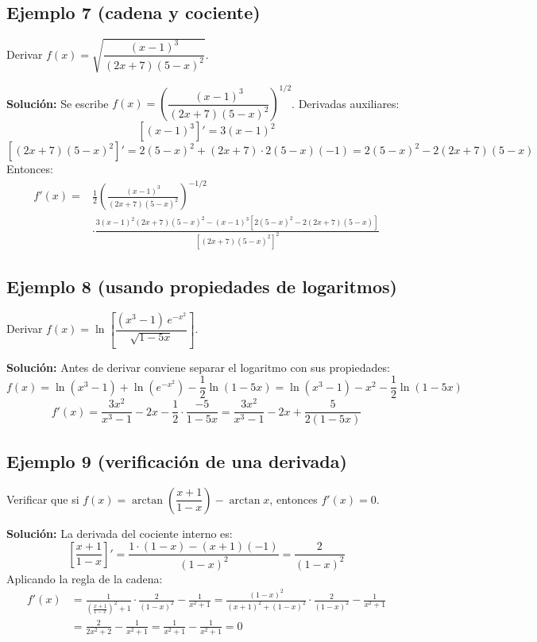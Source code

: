 \documentclass[12pt]{article}
\begin{document}
\subsection{Ejemplo 7 (cadena y cociente)}
Derivar $f(x) = \sqrt{\dfrac{(x - 1)^3}{(2x + 7)(5 - x)^2}}$.

\textbf{Solución:} Se escribe $f(x) = \left(\dfrac{(x - 1)^3}{(2x + 7)(5 - x)^2}\right)^{1/2}$. Derivadas auxiliares:
\[
\left[(x - 1)^3\right]' = 3(x - 1)^2
\]
\[
\left[(2x + 7)(5 - x)^2\right]' = 2(5 - x)^2 + (2x + 7) \cdot 2(5 - x)(-1) = 2(5 - x)^2 - 2(2x + 7)(5 - x)
\]
Entonces:
\begin{align*}
f'(x) = {} & \frac{1}{2}\left(\frac{(x - 1)^3}{(2x + 7)(5 - x)^2}\right)^{-1/2} \\
& \cdot \frac{3(x - 1)^2 (2x + 7)(5 - x)^2 - (x - 1)^3\left[2(5 - x)^2 - 2(2x + 7)(5 - x)\right]}{\left[(2x + 7)(5 - x)^2\right]^2}
\end{align*}

\subsection{Ejemplo 8 (usando propiedades de logaritmos)}
Derivar $f(x) = \ln\left[\dfrac{(x^3 - 1)\,e^{-x^2}}{\sqrt{1 - 5x}}\right]$.

\textbf{Solución:} Antes de derivar conviene separar el logaritmo con sus propiedades:
\[
f(x) = \ln(x^3 - 1) + \ln\left(e^{-x^2}\right) - \frac{1}{2}\ln(1 - 5x) = \ln(x^3 - 1) - x^2 - \frac{1}{2}\ln(1 - 5x)
\]
\[
f'(x) = \frac{3x^2}{x^3 - 1} - 2x - \frac{1}{2} \cdot \frac{-5}{1 - 5x} = \frac{3x^2}{x^3 - 1} - 2x + \frac{5}{2(1 - 5x)}
\]

\subsection{Ejemplo 9 (verificación de una derivada)}
Verificar que si $f(x) = \arctan\left(\dfrac{x + 1}{1 - x}\right) - \arctan x$, entonces $f'(x) = 0$.

\textbf{Solución:} La derivada del cociente interno es:
\[
\left[\frac{x + 1}{1 - x}\right]' = \frac{1 \cdot (1 - x) - (x + 1)(-1)}{(1 - x)^2} = \frac{2}{(1 - x)^2}
\]
Aplicando la regla de la cadena:
\begin{align*}
f'(x) &= \frac{1}{\left(\frac{x + 1}{1 - x}\right)^2 + 1} \cdot \frac{2}{(1 - x)^2} - \frac{1}{x^2 + 1}
= \frac{(1 - x)^2}{(x + 1)^2 + (1 - x)^2} \cdot \frac{2}{(1 - x)^2} - \frac{1}{x^2 + 1} \\
&= \frac{2}{2x^2 + 2} - \frac{1}{x^2 + 1} = \frac{1}{x^2 + 1} - \frac{1}{x^2 + 1} = 0
\end{align*}
\end{document}
